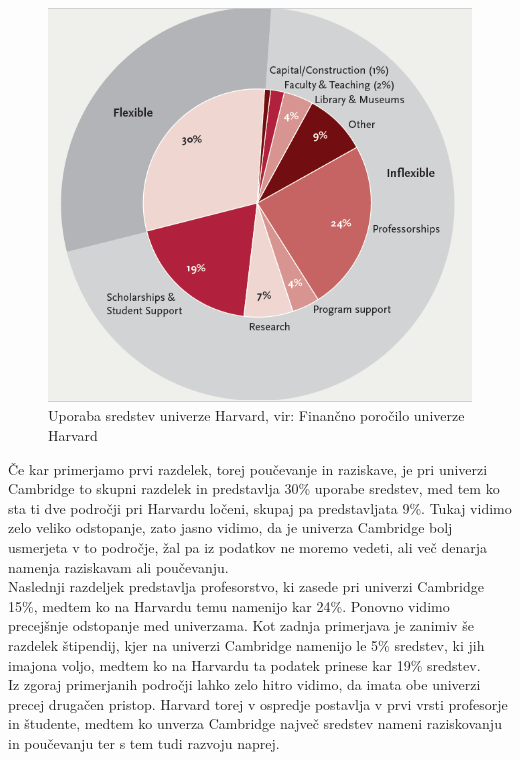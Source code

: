 \documentclass[12pt, a4paper]{article}
\begin{document}
\begin{figure}[!h]
\centering
\includegraphics[width = 12 cm]{slike/harvard.png}
\caption{Uporaba sredstev univerze Harvard, vir: Finančno poročilo univerze Harvard}
\label{Slika 4}
\end{figure}


Če kar primerjamo prvi razdelek, torej poučevanje in raziskave, je pri univerzi Cambridge to skupni razdelek in predstavlja 30\% uporabe sredstev, med tem ko sta ti dve področji pri Harvardu ločeni, skupaj pa predstavljata 9\%. Tukaj vidimo zelo veliko odstopanje, zato jasno vidimo, da je univerza Cambridge bolj usmerjeta v to področje, žal pa iz podatkov ne moremo vedeti, ali več denarja namenja raziskavam ali poučevanju. \\

Naslednji razdeljek predstavlja profesorstvo, ki zasede pri univerzi Cambridge 15\%, medtem ko na Harvardu temu namenijo kar 24\%. Ponovno vidimo precejšnje odstopanje med univerzama. Kot zadnja primerjava je zanimiv še razdelek štipendij, kjer na univerzi Cambridge namenijo le 5\% sredstev, ki jih imajona voljo, medtem ko na Harvardu ta podatek prinese kar 19\% sredstev. \\

Iz zgoraj primerjanih področji lahko zelo hitro vidimo, da imata obe univerzi precej drugačen pristop. Harvard torej v ospredje postavlja v prvi vrsti profesorje in študente, medtem ko unverza Cambridge največ sredstev nameni raziskovanju in poučevanju ter s tem tudi razvoju naprej. 
\end{document}
